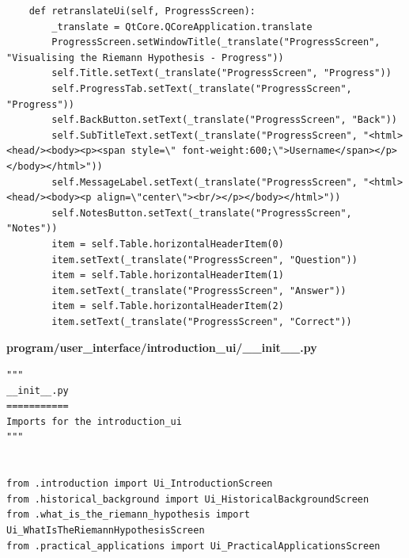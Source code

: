 \documentclass[12pt]{article}
\begin{document}
\begin{lstlisting}
    def retranslateUi(self, ProgressScreen):
        _translate = QtCore.QCoreApplication.translate
        ProgressScreen.setWindowTitle(_translate("ProgressScreen", "Visualising the Riemann Hypothesis - Progress"))
        self.Title.setText(_translate("ProgressScreen", "Progress"))
        self.ProgressTab.setText(_translate("ProgressScreen", "Progress"))
        self.BackButton.setText(_translate("ProgressScreen", "Back"))
        self.SubTitleText.setText(_translate("ProgressScreen", "<html><head/><body><p><span style=\" font-weight:600;\">Username</span></p></body></html>"))
        self.MessageLabel.setText(_translate("ProgressScreen", "<html><head/><body><p align=\"center\"><br/></p></body></html>"))
        self.NotesButton.setText(_translate("ProgressScreen", "Notes"))
        item = self.Table.horizontalHeaderItem(0)
        item.setText(_translate("ProgressScreen", "Question"))
        item = self.Table.horizontalHeaderItem(1)
        item.setText(_translate("ProgressScreen", "Answer"))
        item = self.Table.horizontalHeaderItem(2)
        item.setText(_translate("ProgressScreen", "Correct"))
\end{lstlisting}

\textbf{program/user\_interface/introduction\_ui/\_\_init\_\_.py}
\begin{lstlisting}
"""
__init__.py
===========
Imports for the introduction_ui
"""


from .introduction import Ui_IntroductionScreen
from .historical_background import Ui_HistoricalBackgroundScreen
from .what_is_the_riemann_hypothesis import Ui_WhatIsTheRiemannHypothesisScreen
from .practical_applications import Ui_PracticalApplicationsScreen
\end{lstlisting}
\end{document}
